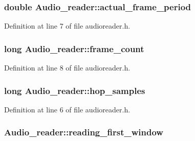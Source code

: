 \subsubsection[{\texorpdfstring{actual\+\_\+frame\+\_\+period}{actual_frame_period}}]{\setlength{\rightskip}{0pt plus 5cm}double Audio\+\_\+reader\+::actual\+\_\+frame\+\_\+period}\hypertarget{class_audio__reader_a18f336bca2ab2d688bfe313a8fcdbb40}{}\label{class_audio__reader_a18f336bca2ab2d688bfe313a8fcdbb40}


Definition at line 7 of file audioreader.\+h.

\subsubsection[{\texorpdfstring{frame\+\_\+count}{frame_count}}]{\setlength{\rightskip}{0pt plus 5cm}long Audio\+\_\+reader\+::frame\+\_\+count}\hypertarget{class_audio__reader_a611b81d8b494d5a1e9779bb9d8cbc018}{}\label{class_audio__reader_a611b81d8b494d5a1e9779bb9d8cbc018}


Definition at line 8 of file audioreader.\+h.

\subsubsection[{\texorpdfstring{hop\+\_\+samples}{hop_samples}}]{\setlength{\rightskip}{0pt plus 5cm}long Audio\+\_\+reader\+::hop\+\_\+samples}\hypertarget{class_audio__reader_a535c41bffd9d2eca08697fa3a7848d2d}{}\label{class_audio__reader_a535c41bffd9d2eca08697fa3a7848d2d}


Definition at line 6 of file audioreader.\+h.

\subsubsection[{\texorpdfstring{reading\+\_\+first\+\_\+window}{reading_first_window}}]{ Audio\+\_\+reader\+::reading\+\_\+first\+\_\+window\hspace{0.3cm}{\ttfamily [protected]}}\hypertarget{class_audio__reader_aa9a58191cc8238882a2dcd909b1abe86}{}\label{class_audio__reader_aa9a58191cc8238882a2dcd909b1abe86}


